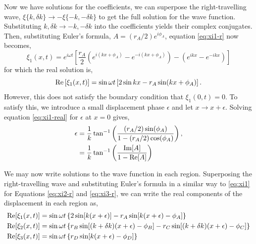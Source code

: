 Now we have solutions for the coefficients, we can superpose the right-travelling wave, \(\xi\{k, \delta k\} \rightarrow - \xi\{-k, -\delta k\}\) to get the full solution for the wave function. Substituting \(k, \delta k \rightarrow -k, -\delta k\) into the coefficients yields their complex conjugates. Then, substituting Euler's formula, \(A = (r_A/2) e^{i\phi_A}\), equation \ref{eq:xi1-r} now becomes,
%
\begin{equation}
    \xi_1(x, t) = e^{i \omega t} \left[ \frac{r_A}{2} \left( e^{i(kx + \phi_A)} - e^{-i(kx + \phi_A)} \right) - \left( e^{ikx} - e^{-ikx} \right) \right] \label{eq:xi1}
\end{equation}
%
for which the real solution is,
\begin{equation}
    {\mathrm{Re}}\left[\xi_1(x, t)\right] = \sin \omega t \left[2 \sin kx - r_A \sin(kx + \phi_A)\right]. \label{eq:xi1-real}
\end{equation}
%
However, this does not satisfy the boundary condition that \(\xi_1(0, t) = 0\). To satisfy this, we introduce a small displacement phase \(\epsilon\) and let \(x \rightarrow x + \epsilon\). Solving equation \ref{eq:xi1-real} for \(\epsilon\) at \(x=0\) gives,
%
\begin{align}
    \epsilon &= \frac{1}{k} \tan^{-1}\left( \frac{(r_A / 2) \sin(\phi_A)}{1 - (r_A/2) \cos(\phi_A)} \right), \notag\\
    &= \frac{1}{k} \tan^{-1}\left( \frac{{\mathrm{Im}}[A]}{1 - {\mathrm{Re}}[A]} \right) \label{eq:1d-phase}
\end{align}
%

We may now write solutions to the wave function in each region. Superposing the right-travelling wave and substituting Euler's formula in a similar way to \ref{eq:xi1} for Equations \ref{eq:xi2-r} and \ref{eq:xi3-r}, we can write the real components of the displacement in each region as,
%
%
%
\begin{align}
    {\mathrm{Re}}[\xi_1(x, t)] &= \sin \omega t \left\{2 \sin[k (x + \epsilon)] - r_A \sin[k(x + \epsilon) - \phi_A]\right\} \\
    {\mathrm{Re}}[\xi_2(x, t)] &= \sin \omega t \left\{ r_B \sin[(k + \delta k)(x + \epsilon) - \phi_B] - r_C \sin[(k + \delta k)(x + \epsilon) - \phi_C]\right\} \\
    {\mathrm{Re}}[\xi_3(x, t)] &= \sin \omega t \left\{r_D \sin[k(x + \epsilon) - \phi_D]\right\}
\end{align}
%

